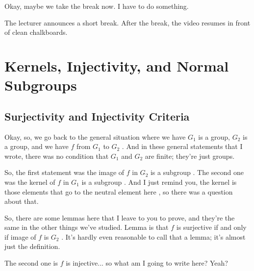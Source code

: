\begin{speech}[00:44:00 - 00:44:05]
Okay, maybe we take the break now. I have to do something.
\end{speech}

\begin{pause}
The lecturer announces a short break. After the break, the video resumes in front of clean chalkboards.
\end{pause}

\begin{hidden}
\end{hidden}

\section{Kernels, Injectivity, and Normal Subgroups}

\subsection{Surjectivity and Injectivity Criteria}

\begin{speech}[00:44:18 - 00:45:34]
Okay, so, we go back to the general situation where we have $G_1$ is a group, $G_2$ is a group, and we have $f$ from $G_1$ to $G_2$ . And in these general statements that I wrote, there was no condition that $G_1$ and $G_2$ are finite; they're just groups.

So, the first statement was the image of $f$ in $G_2$ is a subgroup . The second one was the kernel of $f$ in $G_1$ is a subgroup . And I just remind you, the kernel is those elements that go to the neutral element here , so there was a question about that.

So, there are some lemmas here that I leave to you to prove, and they're the same in the other things we've studied. Lemma is that $f$ is surjective if and only if image of $f$ is $G_2$ . It's hardly even reasonable to call that a lemma; it's almost just the definition.

The second one is $f$ is injective...  so what am I going to write here? Yeah?
\end{speech}

